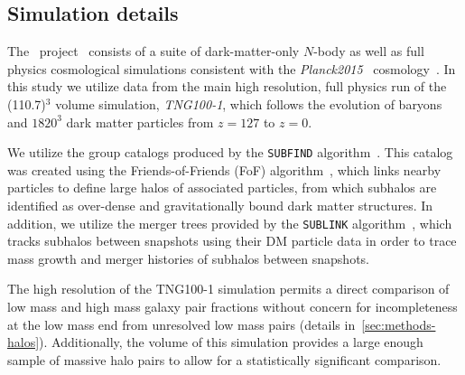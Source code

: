 \documentclass[twocolumn]{aastex631}
\begin{document}
    \subsection{Simulation details} \label{sec:methods-sims}
    The \tng\ project~\citep{TNG1, TNG2, TNG3, TNG4, TNG5} consists of a suite of dark-matter-only $N$-body as well as full physics cosmological simulations consistent with the \textit{Planck2015} \lcdm\  cosmology~\citep{Planck2015}.
    In this study we utilize data from the main high resolution, full physics run of the (110.7\Mpc)$^3$ volume simulation, \textsl{TNG100-1}, which follows the evolution of baryons and $1820^3$ dark matter particles from $z=127$ to $z=0$. 

    We utilize the group catalogs produced by the \texttt{SUBFIND} algorithm~\citep{springel2001,dolag09}. 
    This catalog was created using the Friends-of-Friends (FoF) algorithm~\citep{davis1985}, which links nearby particles to define large halos of associated particles, from which subhalos are identified as over-dense and gravitationally bound dark matter structures.
    In addition, we utilize the merger trees provided by the \texttt{SUBLINK} algorithm~\citep{rg15}, which tracks subhalos between snapshots using their DM particle data in order to trace mass growth and merger histories of subhalos between snapshots.
    
    The high resolution of the TNG100-1 simulation permits a direct comparison of low mass and high mass galaxy pair fractions without concern for incompleteness at the low mass end from unresolved low mass pairs (details in~\ref{sec:methods-halos}).
    Additionally, the volume of this simulation provides a large enough sample of massive halo pairs to allow for a statistically significant comparison. 

\end{document}
